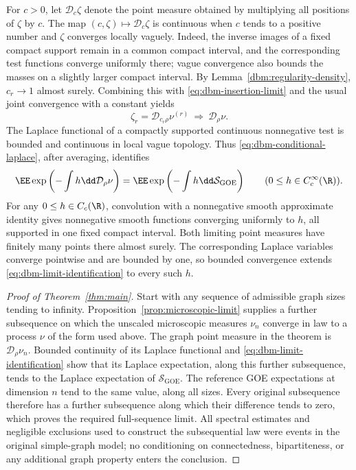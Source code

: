 For \(c>0\), let \(\mathcal D_c\zeta\) denote the point measure
obtained by multiplying all positions of \(\zeta\) by \(c\).
The map \((c,\zeta)\mapsto\mathcal D_c\zeta\) is continuous when
\(c\) tends to a positive number and \(\zeta\) converges locally
vaguely. Indeed, the inverse images of a fixed compact support
remain in a common compact interval, and the corresponding test
functions converge uniformly there; vague convergence also bounds
the masses on a slightly larger compact interval.
By Lemma~\ref{dbm:regularity-density}, \(c_r\to1\) almost surely.
Combining this with \eqref{eq:dbm-insertion-limit} and the usual
joint convergence with a constant yields
\[
 \zeta_r=\mathcal D_{c_r\rho}\nu^{(r)}
       \ \Longrightarrow\ \mathcal D_\rho\nu.
\]
The Laplace functional of a compactly supported continuous
nonnegative test is bounded and continuous in local vague topology.
Thus \eqref{eq:dbm-conditional-laplace}, after averaging, identifies
\begin{equation}
 \label{eq:dbm-limit-identification}
 \EE\exp\left(-\int h\dd\mathcal D_\rho\nu\right)
   =\EE\exp\left(-\int h\dd\mathcal S_{\mathrm{GOE}}\right)
 \qquad (0\le h\in C_c^\infty(\R)).
\end{equation}
For any \(0\le h\in C_c(\R)\), convolution with a nonnegative
smooth approximate identity gives nonnegative smooth functions
converging uniformly to \(h\), all supported in one fixed compact
interval. Both limiting point measures have finitely many points
there almost surely. The corresponding Laplace variables converge
pointwise and are bounded by one, so bounded convergence extends
\eqref{eq:dbm-limit-identification} to every such \(h\).

\begin{proof}[Proof of Theorem~\ref{thm:main}]
Start with any sequence of admissible graph sizes tending to
infinity. Proposition~\ref{prop:microscopic-limit} supplies a further
subsequence on which the unscaled microscopic measures
\(\nu_n\) converge in law to a process \(\nu\) of the form used above.
The graph point measure in the theorem is
\(\mathcal D_\rho\nu_n\). Bounded continuity of its Laplace
functional and \eqref{eq:dbm-limit-identification} show that its
Laplace expectation, along this further subsequence, tends to the
Laplace expectation of \(\mathcal S_{\mathrm{GOE}}\).
The reference GOE expectations at dimension \(n\) tend to the same
value, along all sizes. Every original subsequence therefore has a
further subsequence along which their difference tends to zero,
which proves the required full-sequence limit. All spectral
estimates and negligible exclusions used to construct the
subsequential law were events in the original simple-graph model;
no conditioning on connectedness, bipartiteness, or any additional
graph property enters the conclusion.
\end{proof}


